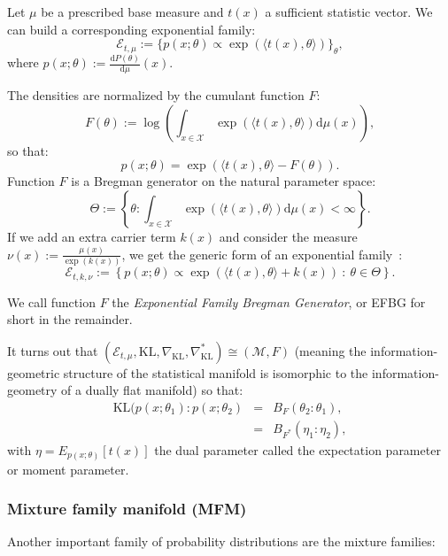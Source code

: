 \documentclass[graybox]{svmult}
\def\inner#1#2{{\langle #1,#2\rangle}}
\def\dmu{\mathrm{d}\mu}
\def\dP{\mathrm{d}P}
\def\KL{\mathrm{KL}}
\def\eqdef{:=}
\def\calE{\mathcal{E}}
\def\calX{\mathcal{X}}
\def\calM{\mathcal{M}}
\def\st{{\ :\ }}
\begin{document}
	\begin{definition}\label{def:ef}
	Let $\mu$ be a prescribed  base measure and $t(x)$ a sufficient statistic vector.
	We can build  a corresponding exponential family:
	\begin{equation}
	\calE_{t,\mu}\eqdef\{p(x;\theta) \propto \exp(\inner{t(x)}{\theta})\}_\theta,
	\end{equation}
	where $p(x;\theta) \eqdef \frac{\dP(\theta)}{\dmu}(x)$.
	
	The densities are normalized by the cumulant function $F$:
	\begin{equation}\label{eq:cf}
	F(\theta)  \eqdef \log \left(\int_{x\in\calX} \exp(\inner{t(x)}{\theta})\dmu(x)\right),
	\end{equation}
	so that:
	\begin{equation}
	p(x;\theta) = \exp(\inner{t(x)}{\theta}-F(\theta)).
	\end{equation}
	Function $F$  is a Bregman generator on the natural parameter space:
	\begin{equation}
	\Theta\eqdef\left\{\theta : \int_{x\in\calX} \exp(\inner{t(x)}{\theta})\dmu(x)<\infty \right\}.
	\end{equation}
	If we add an extra carrier term $k(x)$ and consider the measure $\nu(x)\eqdef \frac{\mu(x)}{\exp(k(x))}$, we get the generic form of an exponential family~\cite{flashcards-2009}:
	\begin{equation}
	\calE_{t,k,\nu}\eqdef\left\{p(x;\theta) \propto \exp(\inner{t(x)}{\theta}+k(x)) \st \theta\in\Theta\right\}.
	\end{equation}
	\end{definition}
	
	We call function $F$ the {\em Exponential Family Bregman Generator}, or EFBG for short in the remainder.
	
	
	It turns out that $(\calE_{t,\mu},\KL,\nabla_\KL,\nabla_\KL^*)\cong (\calM,F)$ (meaning the information-geometric structure of the statistical manifold is isomorphic to the information-geometry of a dually flat manifold) so that:
	\begin{eqnarray}
	\KL(p(x;\theta_1):p(x;\theta_2)&=&B_F(\theta_2:\theta_1),\label{eq:KLBDEF}\\
	&=& B_{F^*}(\eta_1:\eta_2),\label{eq:KLBDEFD}
	\end{eqnarray}
	with $\eta=E_{p(x;\theta)}[t(x)]$ the dual parameter called the expectation parameter or moment parameter.


\subsubsection{Mixture family manifold (MFM)}
 Another important family of probability distributions are the mixture families:
	
\end{document}
